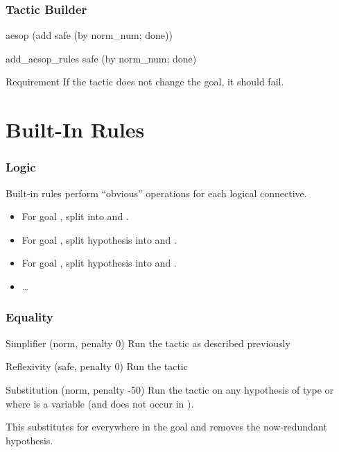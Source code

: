 \begin{frame}[fragile]
  \frametitle{Tactic Builder}

  \begin{leancode}
    aesop (add safe (by norm_num; done))
  \end{leancode}

  \pause

  \begin{leancode}
    add_aesop_rules safe (by norm_num; done)
  \end{leancode}

  \pause
  \bigskip

  \begin{block}{Requirement}
    If the tactic does not change the goal, it should fail.
  \end{block}
\end{frame}

\section{Built-In Rules}

\begin{frame}
  \frametitle{Logic}

  Built-in rules perform \enquote{obvious} operations for each logical connective.

  \begin{itemize}
    \item For goal , split into  and .
    \item For goal , split hypothesis into  and .
    \item For goal , split hypothesis into  and .
    \item \dots
  \end{itemize}
\end{frame}

\begin{frame}
  \frametitle{Equality}

  \begin{block}{Simplifier (norm, penalty 0)}
    Run the  tactic as described previously
  \end{block}

  \pause

  \begin{block}{Reflexivity (safe, penalty 0)}
    Run the  tactic
  \end{block}

  \pause

  \begin{block}{Substitution (norm, penalty -50)}
    Run the  tactic on any hypothesis of type  or  where  is a variable (and  does not occur in ).

    This substitutes  for  everywhere in the goal and removes the now-redundant hypothesis.
  \end{block}
\end{frame}


